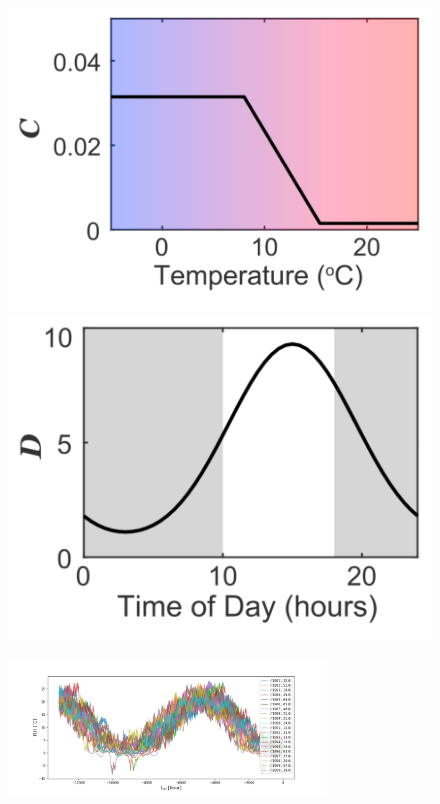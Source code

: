 \documentclass[11pt, a4paper]{article}
\begin{document}
\begin{figure}[h!]
    \centering
    \begin{minipage}{0.4\textwidth}
        \centering
        \includegraphics[width=1.0\textwidth]{./images/param_C.png}
    \end{minipage}
    \hfill
    \begin{minipage}{0.4\textwidth}
        \centering
        \includegraphics[width=1.0\textwidth]{./images/param_D.png}
    \end{minipage}
\end{figure}

\newpage
\begin{figure}[h!]
    \centering
    \includegraphics[width=0.75\textwidth]{images/temp_plot.png}
\end{figure}
\end{document}
